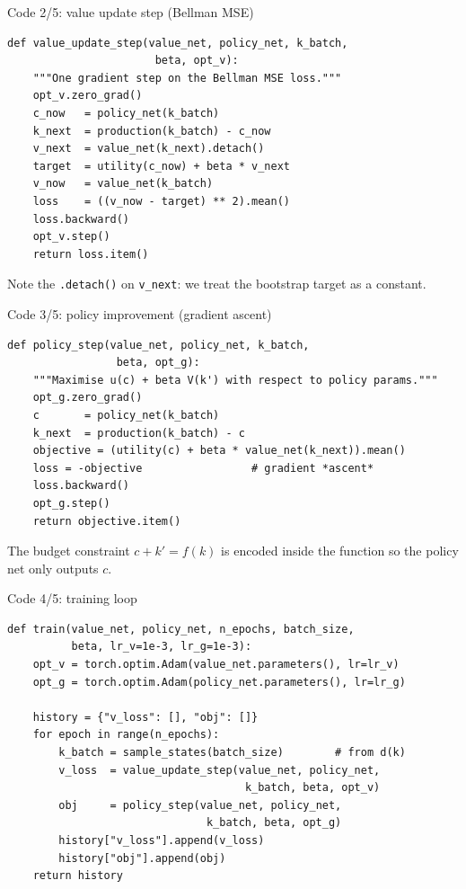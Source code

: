 \begin{frame}[fragile]{Code 2/5: value update step (Bellman MSE)}
\begin{lstlisting}
def value_update_step(value_net, policy_net, k_batch,
                       beta, opt_v):
    """One gradient step on the Bellman MSE loss."""
    opt_v.zero_grad()
    c_now   = policy_net(k_batch)
    k_next  = production(k_batch) - c_now
    v_next  = value_net(k_next).detach()
    target  = utility(c_now) + beta * v_next
    v_now   = value_net(k_batch)
    loss    = ((v_now - target) ** 2).mean()
    loss.backward()
    opt_v.step()
    return loss.item()
\end{lstlisting}
\medskip
Note the \texttt{.detach()} on \texttt{v\_next}: we treat the bootstrap target as a constant.
\end{frame}

\begin{frame}[fragile]{Code 3/5: policy improvement (gradient ascent)}
\begin{lstlisting}
def policy_step(value_net, policy_net, k_batch,
                 beta, opt_g):
    """Maximise u(c) + beta V(k') with respect to policy params."""
    opt_g.zero_grad()
    c       = policy_net(k_batch)
    k_next  = production(k_batch) - c
    objective = (utility(c) + beta * value_net(k_next)).mean()
    loss = -objective                 # gradient *ascent*
    loss.backward()
    opt_g.step()
    return objective.item()
\end{lstlisting}
\medskip
The budget constraint $c+k'=f(k)$ is encoded inside the function so the policy net only outputs $c$.
\end{frame}

\begin{frame}[fragile]{Code 4/5: training loop}
\begin{lstlisting}
def train(value_net, policy_net, n_epochs, batch_size,
          beta, lr_v=1e-3, lr_g=1e-3):
    opt_v = torch.optim.Adam(value_net.parameters(), lr=lr_v)
    opt_g = torch.optim.Adam(policy_net.parameters(), lr=lr_g)

    history = {"v_loss": [], "obj": []}
    for epoch in range(n_epochs):
        k_batch = sample_states(batch_size)        # from d(k)
        v_loss  = value_update_step(value_net, policy_net,
                                     k_batch, beta, opt_v)
        obj     = policy_step(value_net, policy_net,
                               k_batch, beta, opt_g)
        history["v_loss"].append(v_loss)
        history["obj"].append(obj)
    return history
\end{lstlisting}
\end{frame}

